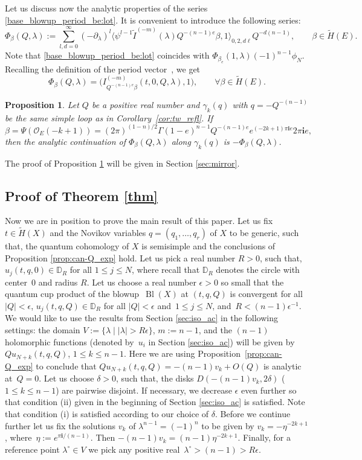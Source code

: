 \documentclass[pdftex]{sigma}
\numberwithin{equation}{section}
\newtheorem{Proposition}[Theorem]{Proposition}
\newcommand{\ii}{\mathbf{i}}
\renewcommand{\O}{\mathcal{O}}
\begin{document}
Let us discuss now the analytic properties of the series \eqref{base_blowup_period_be:lot}. It is convenient to introduce the following series:
\[
\Phi_\beta(Q,\lambda) :=
\sum_{l,d=0}^\infty
(-\partial_\lambda)^l \big\langle
\psi^{l-1} \widetilde{I}^{(-m)}(\lambda)Q^{-(n-1)e}\beta, 1
\big\rangle_{0,2,d\ell}
 Q^{-d(n-1)},\qquad \beta\in\widetilde{H}(E).
\]
Note that \eqref{base_blowup_period_be:lot} coincides with $\Phi_{\beta_e}(1,\lambda) (-1)^{n-1}\phi_N$. Recalling the definition of the period vector~, we get
\[
\Phi_\beta (Q,\lambda)=\big(I^{(-m)}_{Q^{-(n-1)e}\beta}(t,0,Q,\lambda),1\big),
\qquad
\forall \beta \in \widetilde{H}(E).
\]
\begin{Proposition}\label{prop:mon_Phi}
Let $Q$ be a positive real number and $\gamma_k(q)$ with $q=-Q^{-(n-1)}$ be the same simple loop as in Corollary~{\rm\ref{cor:tw_refl}}. If
\[
\beta=\Psi(\O_E(-k+1))=
(2\pi)^{(1-n)/2}
\Gamma(1-e)^{n-1}
Q^{-(n-1) e}
e^{(-2k+1)\pi\ii e}
2\pi \ii e,
\]
then the analytic continuation of $\Phi_\beta(Q,\lambda)$ along $\gamma_k(q)$ is $-\Phi_\beta(Q,\lambda)$.
\end{Proposition}
The proof of Proposition \ref{prop:mon_Phi} will be given in Section
\ref{sec:mirror}.
\subsection{Proof of Theorem \ref{thm}}
Now we are in position to prove the main result of this paper. Let us fix $t\in \widetilde{H}(X)$ and the Novikov variables $q=(q_1,\dots,q_r)$ of $X$ to be generic, such that, the quantum cohomology of $X$ is semisimple and the conclusions of Proposition \ref{prop:can-Q_exp} hold. Let us pick a real number $R>0$, such that, $u_j(t,q,0)\in \mathbb{D}_R$ for all $1\leq j\leq N$, where recall that $\mathbb{D}_R$ denotes the circle with center~$0$ and radius $R$. Let us choose a real number $\epsilon>0$ so small that the quantum cup product of the blowup~$\operatorname{Bl}(X)$ at $(t,q,Q)$ is convergent for all $|Q|<\epsilon$, $u_j(t,q,Q)\in \mathbb{D}_R$ for all $|Q|<\epsilon$ and~$1\leq j\leq N$, and~$R<(n-1)\epsilon^{-1}$. We would like to use the results from Section \eqref{sec:iso_ac} in the following settings: the domain $V:= \{\lambda\mid  |\lambda|>R\epsilon \}$, $m:=n-1$, and the $(n-1)$ holomorphic functions (denoted by~$u_i$ in Section \ref{sec:iso_ac}) will be given by $Qu_{N+k}(t,q,Q)$, $1\leq k\leq n-1$. Here we are using Proposition~\ref{prop:can-Q_exp} to conclude that $Q u_{N+k}(t,q,Q)=-(n-1)v_k + O(Q)$ is analytic at~${Q=0}$. Let us choose $\delta>0$, such that, the disks $D(-(n-1)v_k,2\delta)$ ($1\leq k\leq n-1$) are pairwise disjoint. If necessary, we decrease $\epsilon$ even further so that condition (ii) given in the beginning of Section \ref{sec:iso_ac} is satisfied. Note that condition (i) is satisfied according to our choice of $\delta$. Before we continue further let us fix the solutions $v_k$ of $\lambda^{n-1}=(-1)^n$ to be given by $v_k=-\eta^{-2k+1}$, where~${\eta:=e^{\pi\ii/(n-1)}}$. Then $-(n-1)v_k =(n-1) \eta^{-2k+1}$. Finally, for a reference point $\lambda^\circ\in V$ we pick any positive real~${\lambda^\circ>(n-1)>R\epsilon}$.
\end{document}
